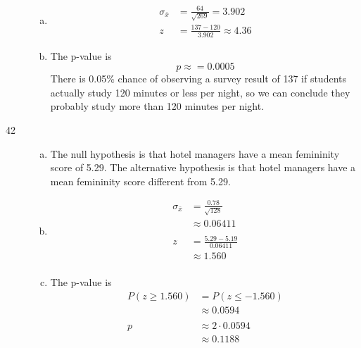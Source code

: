 \documentclass[letterpaper, landscape]{exam}
\begin{document}
\begin{description}
\begin{enumerate}[(a)]
          \item
            \begin{align*}
              \sigma_{\bar{x}} & = \frac{64}{\sqrt{269}} = 3.902 \\
              z                & = \frac{137 - 120}{3.902} \approx 4.36
            \end{align*}

          \item The p-value is 
            \[
              p \approx = \boxed{ 0.0005 } 
            \]
            There is 0.05\% chance of observing a survey result of 137 if
            students actually study 120 minutes or less per night, so we can
            conclude they probably study more than 120 minutes per night.

        \end{enumerate}

      \item[42]
        \begin{enumerate}[(a)]
          \item The null hypothesis is that hotel managers have a mean
            femininity score of 5.29. The alternative hypothesis is that hotel
            managers have a mean femininity score different from 5.29.

          \item
            \begin{align*}
              \sigma_{\bar{x}} & = \frac{0.78}{\sqrt{128}} \\
                               & \approx 0.06411 \\
              \\
              z & = \frac{5.29 - 5.19}{0.06411} \\
                & \approx \boxed{ 1.560 } \\
            \end{align*}

          \item The p-value is 
            \begin{align*}
              P(z \geq 1.560) & = P(z \leq -1.560) \\
                              & \approx 0.0594 \\
              \\
              p & \approx 2 \cdot 0.0594 \\
                & \approx \boxed{ 0.1188 }
            \end{align*}


\end{enumerate}
\end{description}
\end{document}
